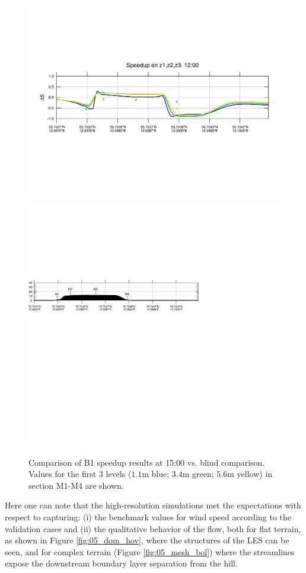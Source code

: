 \begin{figure}[H]
	\centering
	\includegraphics[width=0.9\linewidth,trim={12mm 84mm -5mm 74mm},page=37,clip]{Imagenes/06/bol/speedup}\\%
	\includegraphics[width=0.9\linewidth,trim={-11mm 205mm 100mm 112mm},clip]{Imagenes/06/bol/cross_height}\\%
	\caption{Comparison of B1 speedup results at 15:00 vs. blind comparison. Values for the first 3 levels ($1.1$m blue; $3.4$m green; $5.6$m yellow) in section M1-M4 are shown.}
	\label{fig:06_bol_speedup}
\end{figure}
Here one can note that the high-resolution simulations met the expectations with respect to capturing: (i) the benchmark values for wind speed according to the validation cases and (ii) the qualitative behavior of the flow, both for flat terrain, as shown in Figure \ref{fig:05_dom_hov}, where the structures of the LES can be seen, and for complex terrain (Figure \ref{fig:05_mesh_bol}) where the streamlines expose the downstream boundary layer separation from the hill.


